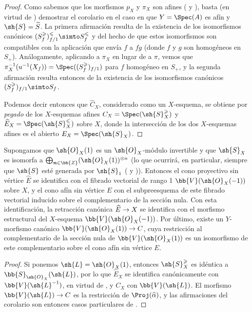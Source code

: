 \documentclass[oneside,10pt]{amsart}
\makeatletter
\renewcommand{\leq}{\leqslant}
\renewcommand{\geq}{\geqslant}
\newcommand{\ega@arrow}[2]{\mathchoice{#1}{#2}{#2}{#2}}
\renewcommand{\to}{\ega@arrow{\longrightarrow}{\rightarrow}}
\let\EGAOriginalLabel\label
\renewcommand{\label}[1]{\phantomsection\EGAOriginalLabel{#1}}
\makeatother
\begin{document}
\begin{proof}
Como sabemos que los morfismos $p_X$ y $\pi_X$ son afines ( y ), basta (en virtud de ) demostrar el corolario en el caso en que $Y=\Spec(A)$ es afín y $\sh{S}=\widetilde{S}$.
La primera afirmación resulta de la existencia de los isomorfismos canónicos  $(S_f^\geq)_{f/1}^\leq \simto S_f^\leq$ y del hecho de que estos isomorfismos son compatibles con la aplicación que envía $f$ a $fg$ (donde $f$ y $g$ son homogéneos en $S_+$).
Análogamente, aplicando  a $\pi_X$ en lugar de a $\pi$, vemos que $\pi_X^{-1}(u^{-1}(X_f)) = \Spec((S_f^\geq)_{f/1})$ para $f$ homogéneo en $S_+$, y la segunda afirmación resulta entonces de la existencia de los isomorfismos canónicos  $(S_f^\geq)_{f/1} \simto S_f$.

Podemos decir entonces que $\widehat{C}_X$, considerado como un $X$-esquema, se obtiene por \emph{pegado} de los $X$-esquemas afines $C_X=\Spec(\sh{S}_X^\geq)$ y $\widehat{E}_X=\Spec(\sh{S}_X^\leq)$ sobre $X$, donde la intersección de los dos $X$-esquemas afines es el abierto $E_X=\Spec(\sh{S}_X)$.
\end{proof}
\begin{corollary}[8.6.4]
\label{II.8.6.4}
Supongamos que $\sh{O}_X(1)$ es un $\sh{O}_X$-módulo invertible y que $\sh{S}_X$ es isomorfa a $\bigoplus_{\boldsymbol n\in\bb{Z}}(\sh{O}_X(1))^{\otimes n}$ (lo que ocurrirá, en particular, siempre que $\sh{S}$ esté generada por $\sh{S}_1$ \textup{(} y \textup{))}.
Entonces el cono proyectivo sin vértice $\widehat{E}$ se identifica con el fibrado vectorial de rango 1 $\bb{V}(\sh{O}_X(-1))$ sobre $X$, y el cono afín sin vértice $E$ con el subpreesquema de este fibrado vectorial inducido sobre el complementario de la sección nula.
Con esta identificación, la retracción canónica $\widehat{E}\to X$ se identifica con el morfismo estructural del $X$-esquema $\bb{V}(\sh{O}_X(-1))$.
Por último, existe un $Y$-morfismo canónico $\bb{V}(\sh{O}_X(1))\to C$, cuya restricción al complementario de la sección nula de $\bb{V}(\sh{O}_X(1))$ es un isomorfismo de este complementario sobre el cono afín sin vértice $E$.
\end{corollary}

\begin{proof}
Si ponemos $\sh{L}=\sh{O}_X(1)$, entonces $\sh{S}_X^\geq$ es idéntica a $\bb{S}_{\sh{O}_X}(\sh{L})$, por lo que $\widehat{E}_X$ se identifica canónicamente con $\bb{V}(\sh{L}^{-1})$, en virtud de , y $C_X$ con $\bb{V}(\sh{L})$.
El morfismo $\bb{V}(\sh{L})\to C$ es la restricción de $\Proj(\widehat{\alpha})$, y las afirmaciones del corolario son entonces casos particulares de .
\end{proof}
\end{document}
